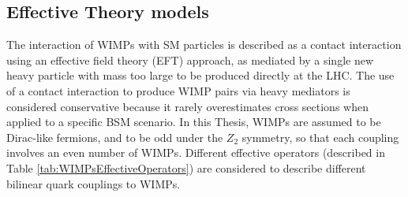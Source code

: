 \subsection{Effective Theory models}

The interaction of WIMPs with SM particles is described as a contact interaction using an effective field theory (EFT) approach, as mediated by a single new heavy particle with mass too large to be produced directly at the LHC.
The use of a contact interaction to produce WIMP pairs via heavy mediators is considered conservative because it rarely overestimates cross sections when applied to a specific BSM scenario.
In this Thesis, WIMPs are assumed to be Dirac-like fermions, and to be odd under the $Z_2$ symmetry, so that each coupling involves an even number of WIMPs.
Different effective operators (described in Table \ref{tab:WIMPsEffectiveOperators}) are considered to describe different bilinear quark couplings to WIMPs.

